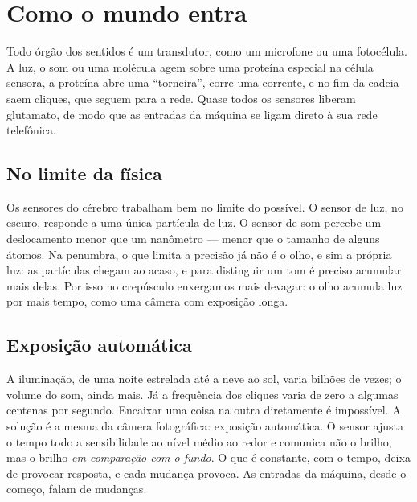 \chapter{Como o mundo entra}

Todo órgão dos sentidos é um transdutor, como um microfone ou uma fotocélula. A luz, o som ou uma molécula agem sobre uma proteína especial na célula sensora, a proteína abre uma ``torneira'', corre uma corrente, e no fim da cadeia saem cliques, que seguem para a rede. Quase todos os sensores liberam glutamato, de modo que as entradas da máquina se ligam direto à sua rede telefônica.

\section*{No limite da física}

Os sensores do cérebro trabalham bem no limite do possível. O sensor de luz, no escuro, responde a uma única partícula de luz. O sensor de som percebe um deslocamento menor que um nanômetro --- menor que o tamanho de alguns átomos. Na penumbra, o que limita a precisão já não é o olho, e sim a própria luz: as partículas chegam ao acaso, e para distinguir um tom é preciso acumular mais delas. Por isso no crepúsculo enxergamos mais devagar: o olho acumula luz por mais tempo, como uma câmera com exposição longa.

\section*{Exposição automática}

A iluminação, de uma noite estrelada até a neve ao sol, varia bilhões de vezes; o volume do som, ainda mais. Já a frequência dos cliques varia de zero a algumas centenas por segundo. Encaixar uma coisa na outra diretamente é impossível. A solução é a mesma da câmera fotográfica: exposição automática. O sensor ajusta o tempo todo a sensibilidade ao nível médio ao redor e comunica não o brilho, mas o brilho \emph{em comparação com o fundo}. O que é constante, com o tempo, deixa de provocar resposta, e cada mudança provoca. As entradas da máquina, desde o começo, falam de mudanças.

